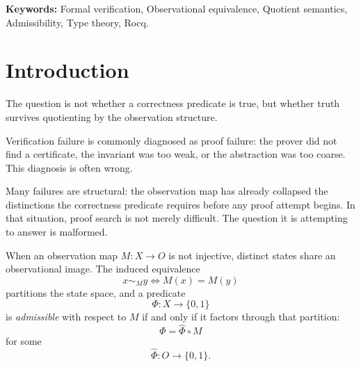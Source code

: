 \documentclass[12pt]{article}
\theoremstyle{plain}
\theoremstyle{definition}
\theoremstyle{remark}
\begin{document}
\begin{titlepage}
\begin{abstract}
The mechanisation shows that inadmissibility is a prior proof
obligation rather than a failure of proof search: verification must
establish that the correctness predicate survives quotienting before
proof search begins. The Rocq development fully proves the Warrant
Debt Theorem, the monitor-as-evidence and conditional safety results,
the concrete rupture decomposition theorem for the
\texttt{SimpleSynergyCompose} instance, and the Non-Factorisation
Theorem. The abstract composition theorem is stated at the interface
level and is provable only for a concrete composition instance
satisfying the required axioms. A higher-order extension to finite
dependency families is presented as a proposed generalisation and
is not part of the present mechanisation.
\end{abstract}
\vspace{0.8em}
\noindent\textbf{Keywords:} Formal verification, Observational equivalence,
Quotient semantics, Admissibility, Type theory, Rocq.
\end{titlepage}

\tableofcontents
\newpage

\section{Introduction}
\label{sec:intro}

The question is not whether a correctness predicate is true,
but whether truth survives quotienting by the observation structure.

Verification failure is commonly diagnosed as proof failure: the prover
did not find a certificate, the invariant was too weak, or the
abstraction was too coarse.
This diagnosis is often wrong.

Many failures are structural: the observation map has already collapsed
the distinctions the correctness predicate requires before any proof
attempt begins.
In that situation, proof search is not merely difficult.
The question it is attempting to answer is malformed.

When an observation map $M : X \to O$ is not injective, distinct states
share an observational image.
The induced equivalence
\[
x \sim_M y \iff M(x) = M(y)
\]
partitions the state space, and a predicate
\[
\Phi : X \to \{0,1\}
\]
is \emph{admissible} with respect to $M$ if and only if it factors
through that partition:
\[
\Phi = \hat{\Phi} \circ M
\]
for some
\[
\hat{\Phi} : O \to \{0,1\}.
\]
\end{document}
